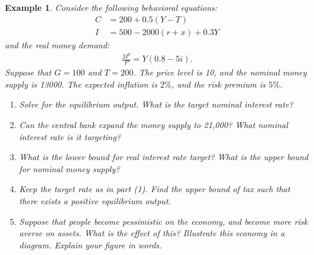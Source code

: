 \documentclass[12pt]{article}
\newtheorem{example}{Example}
\begin{document}
\begin{example}
    Consider the following behavioral equations:
    \begin{align*}
        C &= 200 + 0.5(Y-T)\\
        I &= 500 - 2000(r+x) + 0.3Y
    \end{align*}
    and the real money demand:
    \begin{align*}
        \frac{M^d}{P} = Y(0.8-5i).
    \end{align*}
    Suppose that $G = 100$ and $T = 200$. The price level is 10, and the nominal money supply is 13000. The expected inflation is $2\%$, and the risk premium is $5\%$.
    \begin{enumerate}[label=(\arabic*)]
        \item Solve for the equilibrium output. What is the target nominal interest rate?
        \item Can the central bank expand the money supply to 21,000? What nominal interest rate is it targeting?
        \item What is the lower bound for real interest rate target? What is the upper bound for nominal money supply?
        \item Keep the target rate as in part (1). Find the upper bound of tax such that there exists a positive equilibrium output.
        \item Suppose that people become pessimistic on the economy, and become more risk averse on assets. What is the effect of this? Illustrate this economy in a diagram. Explain your figure in words.
    \end{enumerate}
\end{example}
\end{document}
